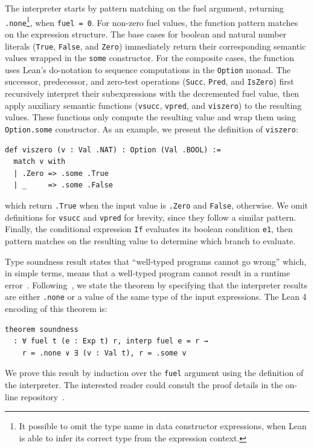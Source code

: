\documentclass[preprint,12pt]{elsarticle}
\theoremstyle{definition}
\begin{document}
The interpreter starts by pattern matching on the fuel argument, returning
\lstinline|.none|\footnote{It possible to omit the type name in data
constructor expressions, when Lean is able to infer its correct type
from the expression context.}, when \lstinline|fuel = 0|.
For non-zero fuel values, the function pattern matches on the expression
structure. The base cases for boolean and natural number literals
(\lstinline|True|, \lstinline|False|, and \lstinline|Zero|) immediately
return their corresponding semantic values wrapped in the \lstinline|some| constructor.
For the composite cases, the function uses Lean's do-notation to
sequence computations in the \lstinline|Option| monad. The successor,
predecessor, and zero-test operations (\lstinline|Succ|, \lstinline|Pred|,
and \lstinline|IsZero|) first recursively interpret their subexpressions
with the decremented fuel value, then apply auxiliary semantic functions
(\lstinline|vsucc|, \lstinline|vpred|, and \lstinline|viszero|) to the
resulting values. These functions only compute the resulting value and
wrap them using \lstinline|Option.some| constructor. As an example,
we present the definition of \lstinline|viszero|:
\begin{lstlisting}
def viszero (v : Val .NAT) : Option (Val .BOOL) :=
  match v with
  | .Zero => .some .True
  | _     => .some .False
\end{lstlisting}
which return \lstinline|.True| when the input value is \lstinline|.Zero|
and \lstinline|False|, otherwise. We omit definitions for \lstinline|vsucc| and
\lstinline|vpred| for brevity, since they follow a similar pattern.
Finally, the conditional expression \lstinline|If| evaluates its
boolean condition \lstinline|e1|, then pattern matches on the
resulting value to determine which branch to evaluate.

Type soundness result states that ``well-typed programs cannot
go wrong'' which, in simple terms, means that a well-typed program
cannot result in a runtime error~\cite{Pierce02}.
Following~\cite{Amin17}, we state the theorem by specifying that
the interpreter results are either \lstinline|.none| or a value of
the same type of the input expressions. The Lean 4 encoding of this
theorem is:

\begin{lstlisting}
theorem soundness
  : ∀ fuel t (e : Exp t) r, interp fuel e = r →
    r = .none ∨ ∃ (v : Val t), r = .some v
\end{lstlisting}

We prove this result by induction over the \lstinline{fuel} argument using
the definition of the interpreter. The interested reader could consult the
proof details in the on-line repository~\cite{pegrepository}.
\end{document}
